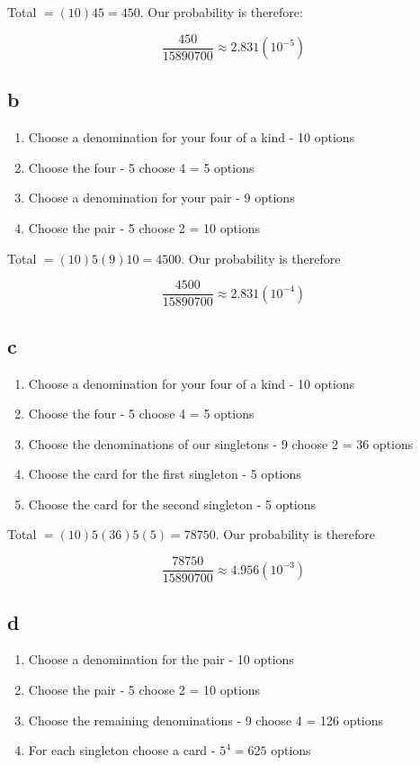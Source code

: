 \documentclass[11pt]{article}
\begin{document}
Total $=(10)45=450$. Our probability is therefore:

$$\frac{450}{15890700}\approx 2.831(10^{-5})$$

\subsection{b}

\begin{enumerate}
\item Choose a denomination for your four of a kind - 10 options
\item Choose the four - 5 choose 4 = 5 options
\item Choose a denomination for your pair - 9 options
\item Choose the pair - 5 choose 2 = 10 options
\end{enumerate}

Total $=(10)5(9)10=4500$. Our probability is therefore 

$$\frac{4500}{15890700}\approx 2.831(10^{-4})$$

\subsection{c}

\begin{enumerate}
\item Choose a denomination for your four of a kind - 10 options
\item Choose the four - 5 choose 4 = 5 options
\item Choose the denominations of our singletons - 9 choose 2 = 36 options
\item Choose the card for the first singleton - 5 options
\item Choose the card for the second singleton - 5 options
\end{enumerate}

Total $=(10)5(36)5(5)=78750$. Our probability is therefore 

$$\frac{78750}{15890700}\approx 4.956(10^{-3})$$

\subsection{d}

\begin{enumerate}
\item Choose a denomination for the pair - 10 options
\item Choose the pair - 5 choose 2 = 10 options
\item Choose the remaining denominations - 9 choose 4 = 126 options
\item For each singleton choose a card - $5^4=625$ options
\end{enumerate}
\end{document}
